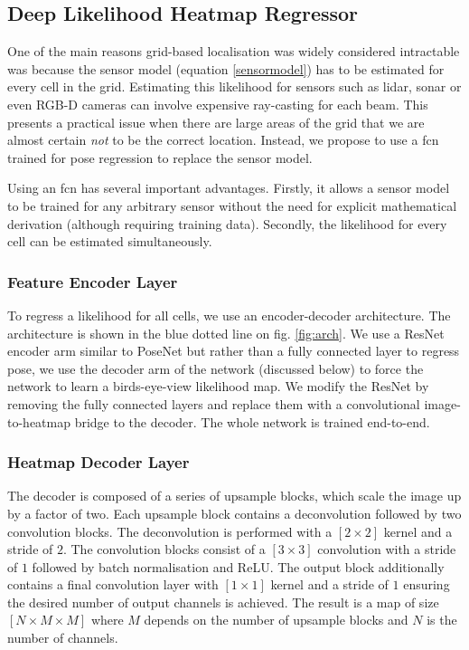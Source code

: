 \documentclass[letterpaper, 10 pt, conference]{ieeeconf}  %
\begin{document}
\subsection{Deep Likelihood Heatmap Regressor}\label{pose-heatmap} 
One of the main reasons grid-based localisation was widely considered intractable was because the sensor model (equation \ref{sensormodel}) has to be estimated for every cell in the grid.
Estimating this likelihood for sensors such as \acs{lidar}, \acs{sonar} or even RGB-D cameras can involve expensive ray-casting for each beam.
This presents a practical issue when there are large areas of the grid that we are almost certain \textit{not} to be the correct location.
Instead, we propose to use a \ac{fcn} trained for pose regression to replace the sensor model.

Using an \ac{fcn} has several important advantages.
Firstly, it allows a sensor model to be trained for any arbitrary sensor without the need for explicit mathematical derivation (although requiring training data).
Secondly, the likelihood for every cell can be estimated simultaneously.

\subsubsection{Feature Encoder Layer}

To regress a likelihood for all cells, we use an encoder-decoder architecture. 
The architecture is shown in the blue dotted line on fig. \ref{fig:arch}.
We use a ResNet encoder arm \cite{he2016deep} similar to PoseNet \cite{kendall2016modelling} but rather than a fully connected layer to regress pose, we use the decoder arm of the network (discussed below) to force the network to learn a birds-eye-view likelihood map.
We modify the ResNet by removing the fully connected layers and replace them with a convolutional image-to-heatmap bridge to the decoder. The whole network is trained end-to-end.

\subsubsection{Heatmap Decoder Layer}\label{sec:hdl}
The decoder is composed of a series of upsample blocks, which scale the image up by a factor of two.
Each upsample block contains a deconvolution followed by two convolution blocks.
The deconvolution is performed with a \ensuremath{[2\times2]} kernel and a stride of \ensuremath{2}.
The convolution blocks consist of a \ensuremath{[3\times3]} convolution with a stride of \ensuremath{1} followed by batch normalisation and ReLU.
The output block additionally contains a final convolution layer with \ensuremath{[1\times1]} kernel and a stride of \ensuremath{1} ensuring the desired number of output channels is achieved.
The result is a map of size \ensuremath{[N \times M \times M]} where \ensuremath{M} depends on the number of upsample blocks and \ensuremath{N} is the number of channels.
\end{document}
